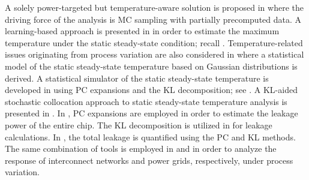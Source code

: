 A solely power-targeted but temperature-aware solution is proposed in
\cite{chandra2010} where the driving force of the analysis is \ac{MC} sampling
with partially precomputed data. A learning-based approach is presented in
\cite{juan2011} in order to estimate the maximum temperature under the static
steady-state condition; recall . Temperature-related
issues originating from process variation are also considered in \cite{juan2012}
where a statistical model of the static steady-state temperature based on
Gaussian distributions is derived. A statistical simulator of the static
steady-state temperature is developed in \cite{huang2009a} using \ac{PC}
expansions and the \acf{KL} decomposition; see
. A \ac{KL}-aided stochastic collocation
\cite{xiu2010} approach to static steady-state temperature analysis is presented
in \cite{lee2013}. In \cite{shen2009}, \ac{PC} expansions are employed in order
to estimate the leakage power of the entire chip. The \ac{KL} decomposition is
utilized in \cite{bhardwaj2006} for leakage calculations. In
\cite{bhardwaj2008}, the total leakage is quantified using the \ac{PC} and
\ac{KL} methods. The same combination of tools is employed in
\cite{vrudhula2006} and \cite{ghanta2006} in order to analyze the response of
interconnect networks and power grids, respectively, under process variation.

